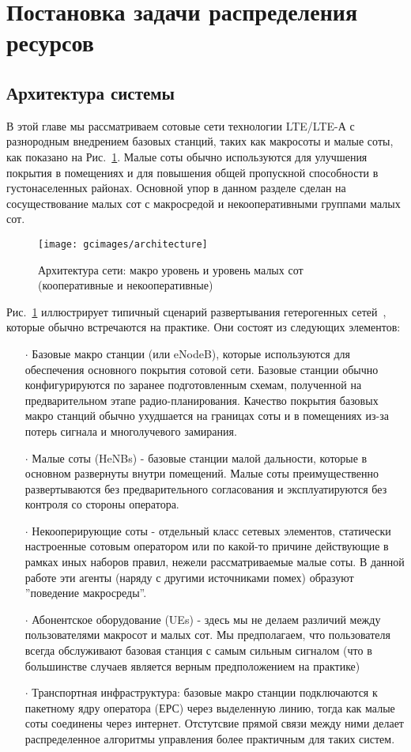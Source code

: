 \section{Постановка задачи распределения ресурсов}
\subsection{Архитектура системы}
В этой главе мы рассматриваем сотовые сети технологии LTE/LTE-А с разнородным внедрением базовых станций, таких как макросоты и малые соты, как показано на Рис.~\ref{fig:architecture}. Малые соты обычно используются для улучшения покрытия в помещениях и для повышения общей пропускной способности в густонаселенных районах. Основной упор в данном разделе сделан на сосуществование малых сот с макросредой и некооперативными группами малых сот.

\begin{figure}[]
    \centering
    \texttt{[image: gcimages/architecture]}
    \caption{Архитектура сети: макро уровень и уровень малых сот (кооперативные и некооперативные)}
    \label{fig:architecture}
\end{figure}

Рис.~\ref{fig:architecture} иллюстрирует типичный сценарий развертывания гетерогенных сетей~\cite{6824744}, которые обычно встречаются на практике. Они состоят из следующих элементов:

\begin{itemize}
\item[$\cdot$] Базовые макро станции (или eNodeB), которые используются для обеспечения основного покрытия сотовой сети. Базовые станции обычно конфигурируются по заранее подготовленным схемам, полученной на предварительном этапе радио-планирования. Качество покрытия базовых макро станций обычно ухудшается на границах соты и в помещениях из-за потерь сигнала и многолучевого замирания. 
\item[$\cdot$] Малые соты (HeNBs) - базовые станции малой дальности, которые в основном развернуты внутри помещений. Малые соты преимущественно развертываются без предварительного согласования и эксплуатируются без контроля со стороны оператора.
\item[$\cdot$] Некооперирующие соты - отдельный класс сетевых элементов, статически настроенные сотовым оператором или по какой-то причине действующие в рамках иных наборов правил, нежели рассматриваемые малые соты. В данной работе эти агенты (наряду с другими источниками помех) образуют ''поведение макросреды''.
\item[$\cdot$] Абонентское оборудование (UEs) - здесь мы не делаем различий между пользователями макросот и малых сот. Мы предполагаем, что пользователя всегда обслуживают базовая станция с самым сильным сигналом (что в большинстве случаев является верным предположением на практике)
\item[$\cdot$] Транспортная инфраструктура: базовые макро станции подключаются к пакетному ядру оператора (ЕРС) через выделенную линию, тогда как малые соты соединены через интернет. Отстутсвие прямой связи между ними делает распределенное алгоритмы управления более практичным для таких систем.
\end{itemize}

